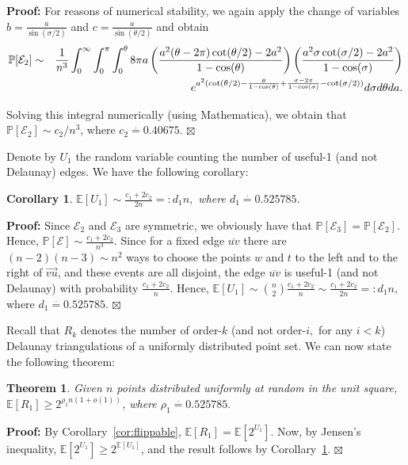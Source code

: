 \documentclass {journal}
\newtheorem {theorem} {Theorem}
\newtheorem {corollary} {Corollary}
\newenvironment {proof}{\textbf {Proof:}}{\hfill \ensuremath {\boxtimes}}
\newcommand{\bE}{{\mathbb E}}
\newcommand{\bP}{{\mathbb P}}
\begin{document}
\begin{proof}
For reasons of numerical stability, we again apply the change of
variables $b=\frac{a}{\sin(\sigma/2)}$ and
$c=\frac{a}{\sin(\theta/2)}$ and obtain
\begin{eqnarray*}\label{eq:case2_3}
 \bP[\mathcal{E}_2]&\sim&\frac{1}{n^3}
\int_0^{\infty} \int_{0}^{\pi} \int_{0}^{\theta} 8 \pi a \left(
\frac{a^2 (\theta -2\pi)\cot(\theta/2)-2a^2}{1-\cos(\theta)}
\right) \left( \frac{a^2 \sigma
\cot(\sigma/2)-2a^2}{1-\cos(\sigma)} \right)
 \notag\\
&& e^{a^2(\cot(\theta/2)-\frac{\theta}{1-\cos(\theta)}+
\frac{\sigma-2\pi}{1-\cos(\sigma)} - \cot(\sigma/2))} d\sigma
d\theta da.
\end{eqnarray*}

Solving this integral numerically (using Mathematica), we obtain
that  $\bP[\mathcal{E}_2]\sim c_2/n^3$, where $c_2
\stackrel{\cdot}{=} 0.40675$.
\end{proof}

Denote by $U_1$ the random variable counting the number of
useful-1 (and not Delaunay) edges. We have the following
corollary:
\begin{corollary}\label{cor:useful_1}
$\bE[U_1] \sim\frac{c_1+2c_2}{2n} =: d_1 n,$ where $d_1
\stackrel{\cdot}{=} 0.525785$.
\end{corollary}
\begin{proof}
Since $\mathcal{E}_2$ and $\mathcal{E}_3$ are symmetric, we
obviously have that $ \bP[\mathcal{E}_3]=\bP[\mathcal{E}_2].$
Hence, $\bP[\mathcal{E}]\sim \frac{c_1+2c_2}{n^3}.$ Since for a
fixed edge $\overline{uv}$ there are $(n-2)(n-3) \sim n^2$ ways to
choose the points $w$ and $t$ to the left and to the right of
$\overrightarrow{vu}$, and these events are all disjoint, the edge
$\overline{uv}$ is useful-1 (and not Delaunay) with probability
$\frac{c_1+2c_2}{n}$. Hence, $\bE[U_1] \sim \binom{n}{2}
\frac{c_1+2c_2}{n} \sim \frac{c_1+2c_2}{2n} =: d_1 n,$ where $d_1
\stackrel{\cdot}{=} 0.525785$.
\end{proof}

Recall that $R_k$ denotes the number of order-$k$ (and not
order-$i,$ for any $i < k$) Delaunay triangulations of a uniformly
distributed point set. We can now state the following theorem:

\begin{theorem}\label{thm:triangulations1}
Given $n$ points distributed uniformly at random in the unit
square, $\bE[R_1] \geq 2^{\rho_1 n(1+o(1))}$, where $\rho_1
\stackrel{\cdot}{=} 0.525785.$
\end{theorem}
\begin{proof}
By Corollary~\ref{cor:flippable}, $\bE[R_1]=\bE[2^{U_1}]$. Now, by
Jensen's inequality, $\bE[2^{U_1}] \geq 2^{\bE[U_1]}$, and the
result follows by Corollary~\ref{cor:useful_1}.
\end{proof}
\end{document}
